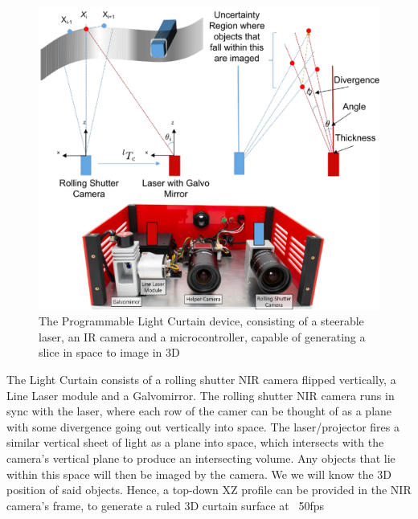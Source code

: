 \documentclass[review]{cvpr}
\begin{document}
\begin{figure}[h]
   \centering
   \begin{minipage}{0.5\textwidth}
       \centering
       \includegraphics[width=1.0\textwidth]{figures/LC.pdf} %
   \end{minipage}\hfill
   \centering
   \caption{The Programmable Light Curtain device, consisting of a steerable laser, an IR camera and a microcontroller, capable of generating a slice in space to image in 3D}
\end{figure}

The Light Curtain consists of a rolling shutter NIR camera flipped vertically, a Line Laser module and a Galvomirror. The rolling shutter NIR camera runs in sync with the laser, where each row of the camer can be thought of as a plane with some divergence going out vertically into space. The laser/projector fires a similar vertical sheet of light as a plane into space, which intersects with the camera's vertical plane to produce an intersecting volume. Any objects that lie within this space will then be imaged by the camera. We we will know the 3D position of said objects. Hence, a top-down XZ profile can be provided in the NIR camera's frame, to generate a ruled 3D curtain surface at ~50fps
\end{document}
